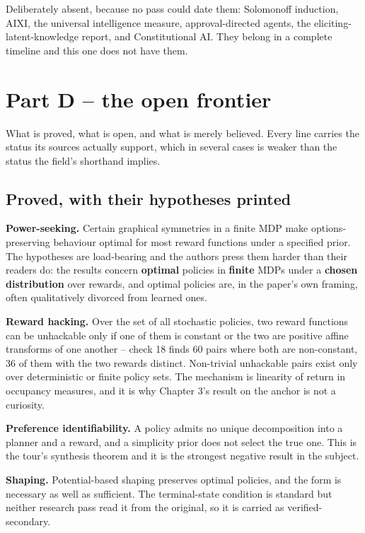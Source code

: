 Deliberately absent, because no pass could date them: Solomonoff induction, AIXI, the universal intelligence measure, approval-directed agents, the eliciting-latent-knowledge report, and Constitutional AI. They belong in a complete timeline and this one does not have them.

\chapter*{Part D -- the open frontier}

What is proved, what is open, and what is merely believed. Every line carries the status its sources actually support, which in several cases is weaker than the status the field's shorthand implies.

\section*{Proved, with their hypotheses printed}

\textbf{Power-seeking.} Certain graphical symmetries in a finite MDP make options-preserving behaviour optimal for most reward functions under a specified prior. The hypotheses are load-bearing and the authors press them harder than their readers do: the results concern \textbf{optimal} policies in \textbf{finite} MDPs under a \textbf{chosen distribution} over rewards, and optimal policies are, in the paper's own framing, often qualitatively divorced from learned ones.

\textbf{Reward hacking.} Over the set of all stochastic policies, two reward functions can be unhackable only if one of them is constant or the two are positive affine transforms of one another -- check 18 finds 60 pairs where both are non-constant, 36 of them with the two rewards distinct. Non-trivial unhackable pairs exist only over deterministic or finite policy sets. The mechanism is linearity of return in occupancy measures, and it is why Chapter 3's result on the anchor is not a curiosity.

\textbf{Preference identifiability.} A policy admits no unique decomposition into a planner and a reward, and a simplicity prior does not select the true one. This is the tour's synthesis theorem and it is the strongest negative result in the subject.

\textbf{Shaping.} Potential-based shaping preserves optimal policies, and the form is necessary as well as sufficient. The terminal-state condition is standard but neither research pass read it from the original, so it is carried as verified-secondary.

